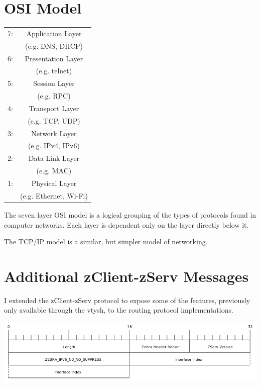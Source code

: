\appendix 
\chapter{OSI Model}
\label{osi}
  \begin{center}
  \begin{tabular}{|lc|}
  \hline
  7: &
  Application Layer \\
  & (e.g. DNS, DHCP) \\
  \hline
  6: &
  Presentation Layer \\
  & (e.g. telnet) \\ 
  \hline
  5: &
  Session Layer \\
  & (e.g. RPC) \\
  \hline
  4: &
  Transport Layer \\
  & (e.g. TCP, UDP) \\
  \hline
  3: &
  Network Layer \\
  & (e.g. IPv4, IPv6) \\
  \hline  
  2: &
  Data Link Layer \\
  & (e.g. MAC) \\ 
  \hline  
  1: &
  Physical Layer \\
  & (e.g. Ethernet, Wi-Fi) \\
  \hline
\end{tabular}
\end{center}

The seven layer OSI model is a logical grouping of the types of protocols found
in computer networks. Each layer is dependent only on the layer directly below
it. 

The TCP/IP model is a similar, but simpler model of networking.

\chapter{Additional zClient-zServ Messages}
\label{zClient}
I extended the zClient-zServ protocol to expose some of the features,
previously only available through the vtysh, to the routing protocol
implementations. 

\begin{center}
	\includegraphics[width=0.9\linewidth]{../Diagrams/Packets/nd_no_suppress.png}
\end{center}

